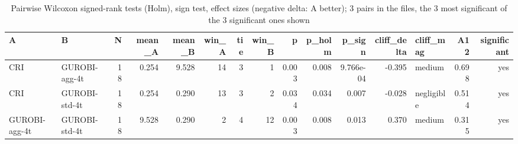 \begin{table}[htbp]
\centering
\small
\caption{Pairwise Wilcoxon signed-rank tests (Holm), sign test, effect sizes (negative delta: A better); 3 pairs in the files, the 3 most significant of the 3 significant ones shown}
\label{tab:E7_gurobi_threads_b10_pairwise}
\begin{tabular}{llrrrrrrrrrrlrr}
\toprule
A & B & N & mean\_A & mean\_B & win\_A & tie & win\_B & p & p\_holm & p\_sign & cliff\_delta & cliff\_mag & A12 & significant \\
\midrule
CRI & GUROBI-agg-4t & 18 & 0.254 & 9.528 & 14 & 3 & 1 & 0.003 & 0.008 & 9.766e-04 & -0.395 & medium & 0.698 & yes \\
CRI & GUROBI-std-4t & 18 & 0.254 & 0.290 & 13 & 3 & 2 & 0.034 & 0.034 & 0.007 & -0.028 & negligible & 0.514 & yes \\
GUROBI-agg-4t & GUROBI-std-4t & 18 & 9.528 & 0.290 & 2 & 4 & 12 & 0.003 & 0.008 & 0.013 & 0.370 & medium & 0.315 & yes \\
\bottomrule
\end{tabular}
\end{table}
